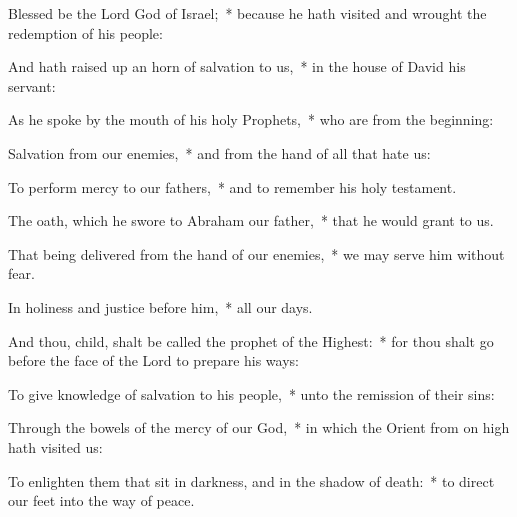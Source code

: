 \begin{enpars}
 \item Blessed be the Lord \cc{} God of Israel;~* because he hath visited and wrought the redemption of his people:
 
 \item And hath raised up an horn of salvation to us,~* in the house of David his servant:
 
\item As he spoke by the mouth of his holy Prophets,~* who are from the beginning:
 
 \item Salvation from our enemies,~* and from the hand of all that hate us:
 
 \item To perform mercy to our fathers,~* and to remember his holy testament.
 
\item The oath, which he swore to Abraham our father,~* that he would grant to us.
 
 \item That being delivered from the hand of our enemies,~* we may serve him without fear.
 
\item In holiness and justice before him,~* all our days.
 
\item And thou, child, shalt be called the prophet of the Highest:~* for thou shalt go before the face of the Lord to prepare his ways:
 
\item To give knowledge of salvation to his people,~* unto the remission of their sins:
 
\item Through the bowels of the mercy of our God,~* in which the Orient from on high hath visited us:
 
 \item To enlighten them that sit in darkness, and in the shadow of death:~* to direct our feet into the way of peace.
 \end{enpars}